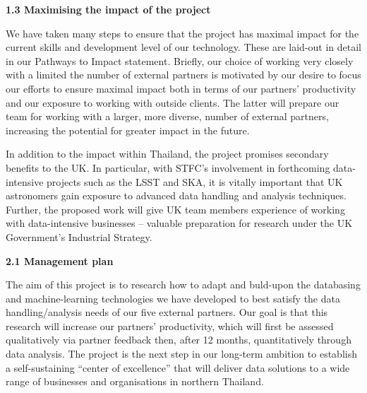 \documentclass[11pt]{article}
\begin{document}
\vspace{3mm}
\noindent
{\large \bf 1.3 Maximising the impact of the project}

\noindent
We have taken many steps to ensure that the project has maximal impact for the current skills and development level of our technology. These are laid-out in detail in our Pathways to Impact statement. Briefly, our choice of working very closely with a limited the number of external partners is motivated by our desire to focus our efforts to ensure maximal impact both in terms of our partners' productivity and our exposure to working with outside clients. The latter will prepare our team for working with a larger, more diverse, number of external partners, increasing the potential for greater impact in the future.

\vspace{2mm}
\noindent
In addition to the impact within Thailand, the project promises secondary benefits to the UK. In particular, with STFC's involvement in forthcoming data-intensive projects such as the LSST and SKA, it is vitally important that UK astronomers gain exposure to advanced data handling and analysis techniques. Further, the proposed work will give UK team members experience of working with data-intensive businesses -- valuable preparation for research under the UK Government's Industrial Strategy.

\vspace{3mm}
\noindent
{\large \bf 2.1 Management plan}

\noindent
The aim of this project is to research how to adapt and buld-upon the databasing and machine-learning technologies we have developed to best satisfy the data handling/analysis needs of our five external partners. Our goal is that this research will increase our partners' productivity, which will first be assessed qualitatively via partner feedback then, after 12 months, quantitatively through data analysis. The project is the next step in our long-term ambition to establish a self-sustaining ``center of excellence'' that will deliver data solutions to a wide range of businesses and organisations in northern Thailand.
\end{document}
